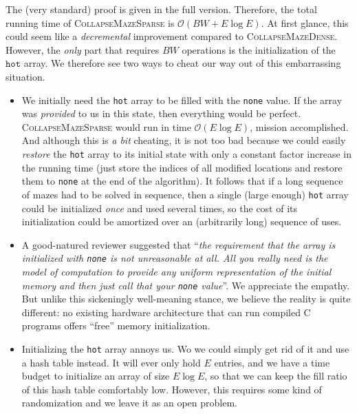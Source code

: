 \documentclass[a4paper,UKenglish,cleveref, autoref]{lipics-v2021}
\newcommand{\bigO}[1]{\ensuremath{\mathcal{O}\left( #1 \right)} }
\begin{document}
The (very standard) proof is given in the full version. Therefore, the total
running time of \textsc{CollapseMazeSparse} is $\bigO{BW + E \log E}$. At first
glance, this could seem like a \emph{decremental} improvement compared to
\textsc{CollapseMazeDense}. However, the \emph{only} part that requires $BW$
operations is the initialization of the $\texttt{hot}$ array. We therefore see
two ways to cheat our way out of this embarrassing situation.

\begin{itemize}
\item We initially need the \texttt{hot} array to be filled with the
  \texttt{none} value. If the array was \emph{provided} to us in this state,
  then everything would be perfect. \textsc{CollapseMazeSparse} would run in
  time $\bigO{E \log E}$, mission accomplished. And although this is \emph{a
    bit} cheating, it is not too bad because we could easily \emph{restore} the
  \texttt{hot} array to its initial state with only a constant factor increase
  in the running time (just store the indices of all modified locations and
  restore them to \texttt{none} at the end of the algorithm).
  It follows that if a long sequence of mazes had to be solved in sequence, then
  a single (large enough) \texttt{hot} array could be initialized \emph{once}
  and used several times, so the cost of its initialization could be amortized
  over an (arbitrarily long) sequence of uses.

\item A good-natured reviewer suggested that ``\emph{the requirement that the
    array is initialized with \texttt{none} is not unreasonable at all. All you
    really need is the model of computation to provide \emph{any} uniform
    representation of the initial memory and then just call that your
    \texttt{none} value}''. We appreciate the empathy. But unlike this
  sickeningly well-meaning stance, we believe the reality is quite different: no
  existing hardware architecture that can run compiled C programs offers
  ``free'' memory initialization.
  
\item Initializing the \texttt{hot} array annoys us. Wo we could simply get rid
  of it and use a hash table instead. It will ever only hold $E$ entries, and we
  have a time budget to initialize an array of size $E \log E$, so that we can
  keep the fill ratio of this hash table comfortably low.  However, this
  requires some kind of randomization and we leave it as an open problem.
\end{itemize}
\end{document}
